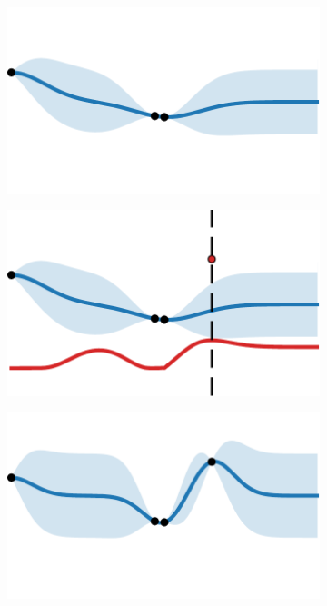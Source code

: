 \begin{figure}[b]
    \centering
    \begin{subfigure}{.31\textwidth}
      \centering
      \includegraphics[width=\textwidth]{images/part2/bayesian_optimization/iter_3.pdf}
      \caption{}
      \label{fig:part2:bayesian_optimization:bo_1}
    \end{subfigure}%
    \hspace{0.03\textwidth}%
    \begin{subfigure}{.31\textwidth}
      \centering
      \includegraphics[width=\textwidth]{images/part2/bayesian_optimization/iter_4.pdf}
      \caption{}
      \label{fig:part2:bayesian_optimization:bo_2}
    \end{subfigure}%
    \hspace{0.03\textwidth}%
    \begin{subfigure}{.31\textwidth}
      \centering
      \includegraphics[width=\textwidth]{images/part2/bayesian_optimization/iter_5.pdf}

\end{subfigure}
\end{figure}
